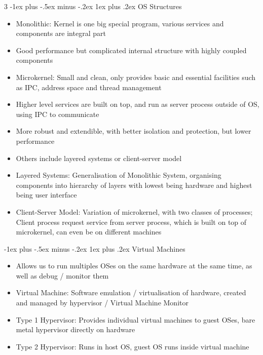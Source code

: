 \documentclass[10pt, landscape]{article}
\makeatletter
\renewcommand{\subsection}{\@startsection{subsection}{3}{0mm}%
                                {-1ex plus -.5ex minus -.2ex}%
                                {1ex plus .2ex}%
                                {\normalfont\small\bfseries}}%
\makeatother
\begin{document}
\begin{multicols*}{3}
\subsection{OS Structures}
\begin{itemize}
    \item Monolithic: Kernel is one big special program, various services and components are integral part
    \item Good performance but complicated internal structure with highly coupled components
    \item Microkernel: Small and clean, only provides basic and essential facilities such as IPC, address space and thread management
    \item Higher level services are built on top, and run as server process outside of OS, using IPC to communicate
    \item More robust and extendible, with better isolation and protection, but lower performance
    \item Others include layered systems or client-server model
    \item Layered Systems: Generalisation of Monolithic System, organising components into hierarchy of layers with lowest being hardware and highest being user interface
    \item Client-Server Model: Variation of microkernel, with two classes of processes; Client process request service from server process, which is built on top of microkernel, can even be on different machines
\end{itemize}

\subsection{Virtual Machines}
\begin{itemize}
    \item Allows us to run multiples OSes on the same hardware at the same time, as well as debug / monitor them
    \item Virtual Machine: Software emulation / virtualisation of hardware, created and managed by hypervisor / Virtual Machine Monitor
    \item Type 1 Hypervisor: Provides individual virtual machines to guest OSes, bare metal hypervisor directly on hardware
    \item Type 2 Hypervisor: Runs in host OS, guest OS runs inside virtual machine
\end{itemize}


\end{multicols*}
\end{document}
